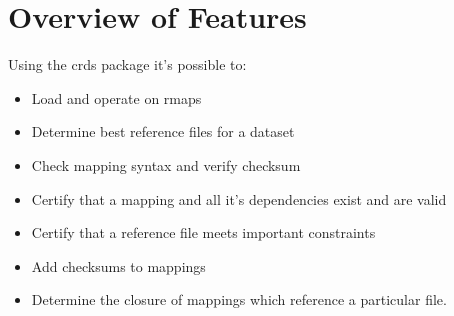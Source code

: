 \documentclass[letterpaper,10pt,english]{sphinxmanual}
\begin{document}
\section{Overview of Features}
\label{core_library_functions:overview-of-features}
Using the crds package it's possible to:
\begin{itemize}
\item {} 
Load and operate on rmaps

\item {} 
Determine best reference files for a dataset

\item {} 
Check mapping syntax and verify checksum

\item {} 
Certify that a mapping and all it's dependencies exist and are valid

\item {} 
Certify that a reference file meets important constraints

\item {} 
Add checksums to mappings

\item {} 
Determine the closure of mappings which reference a particular file.

\end{itemize}
\end{document}
